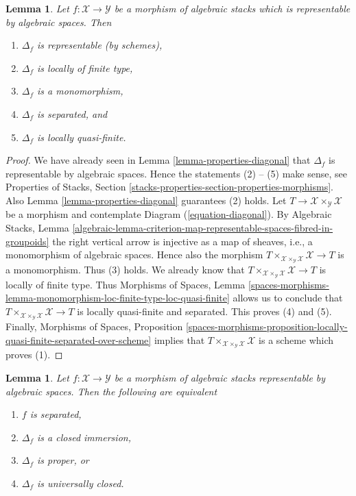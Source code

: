 \documentclass{stacks-project}
\theoremstyle{plain}
\newtheorem{lemma}[subsection]{Lemma}
\theoremstyle{definition}
\theoremstyle{remark}
\numberwithin{equation}{subsection}
\begin{document}
\begin{lemma}
\label{lemma-properties-diagonal-representable}
Let $f : \mathcal{X} \to \mathcal{Y}$ be a morphism of algebraic stacks
which is representable by algebraic spaces. Then
\begin{enumerate}
\item $\Delta_f$ is representable
(by schemes),
\item $\Delta_f$ is locally of finite type,
\item $\Delta_f$ is a monomorphism,
\item $\Delta_f$ is separated, and
\item $\Delta_f$ is locally quasi-finite.
\end{enumerate}
\end{lemma}

\begin{proof}
We have already seen in
Lemma \ref{lemma-properties-diagonal}
that $\Delta_f$ is representable by algebraic
spaces. Hence the statements (2) -- (5) make sense, see
Properties of Stacks,
Section \ref{stacks-properties-section-properties-morphisms}.
Also
Lemma \ref{lemma-properties-diagonal}
guarantees (2) holds.
Let $T \to \mathcal{X} \times_\mathcal{Y} \mathcal{X}$ be a morphism
and contemplate Diagram (\ref{equation-diagonal}). By
Algebraic Stacks, Lemma
\ref{algebraic-lemma-criterion-map-representable-spaces-fibred-in-groupoids}
the right vertical arrow is injective as a map of sheaves, i.e., a
monomorphism of algebraic spaces. Hence also the morphism
$T \times_{\mathcal{X} \times_\mathcal{Y} \mathcal{X}} \mathcal{X} \to T$
is a monomorphism. Thus (3) holds. We already know that
$T \times_{\mathcal{X} \times_\mathcal{Y} \mathcal{X}} \mathcal{X} \to T$
is locally of finite type. Thus
Morphisms of Spaces, Lemma
\ref{spaces-morphisms-lemma-monomorphism-loc-finite-type-loc-quasi-finite}
allows us to conclude that
$T \times_{\mathcal{X} \times_\mathcal{Y} \mathcal{X}} \mathcal{X} \to T$
is locally quasi-finite and separated. This proves (4) and (5).
Finally,
Morphisms of Spaces, Proposition
\ref{spaces-morphisms-proposition-locally-quasi-finite-separated-over-scheme}
implies that
$T \times_{\mathcal{X} \times_\mathcal{Y} \mathcal{X}} \mathcal{X}$
is a scheme which proves (1).
\end{proof}

\begin{lemma}
\label{lemma-representable-separated-diagonal-closed}
Let $f : \mathcal{X} \to \mathcal{Y}$ be a morphism of algebraic stacks
representable by algebraic spaces. Then the following are equivalent
\begin{enumerate}
\item $f$ is separated,
\item $\Delta_f$ is a closed immersion,
\item $\Delta_f$ is proper, or
\item $\Delta_f$ is universally closed.
\end{enumerate}
\end{lemma}
\end{document}
